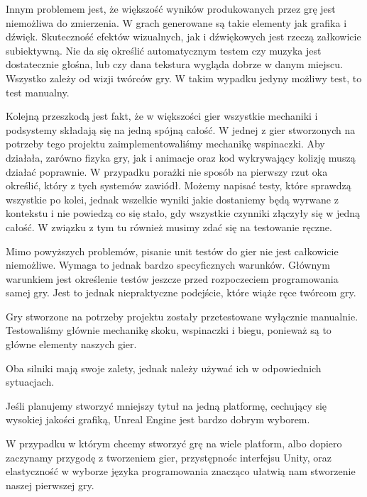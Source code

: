 \documentclass[openright]{xmgr}
\begin{document}
Innym problemem jest, że większość wyników produkowanych przez grę jest niemożliwa do zmierzenia.
W grach generowane są takie elementy jak grafika i dźwięk.  Skuteczność efektów wizualnych, jak i dźwiękowych jest rzeczą załkowicie subiektywną. Nie da się określić automatycznym testem czy muzyka jest dostatecznie głośna, lub czy dana tekstura wygląda dobrze w danym miejscu. Wszystko zależy od wizji twórców gry. W takim wypadku jedyny możliwy test, to test manualny.

Kolejną przeszkodą jest fakt, że w większości gier wszystkie mechaniki i podsystemy składają się na jedną spójną całość. W jednej z gier stworzonych na potrzeby tego projektu zaimplementowaliśmy mechanikę wspinaczki. Aby działała, zarówno fizyka gry, jak i animacje oraz kod wykrywający kolizję muszą działać poprawnie. W przypadku porażki nie sposób na pierwszy rzut oka określić, który z tych systemów zawiódł. Możemy napisać testy, które sprawdzą wszystkie po kolei, jednak wszelkie wyniki jakie dostaniemy będą wyrwane z kontekstu i nie powiedzą co się stało, gdy wszystkie czynniki złączyły się w jedną całość. W związku z tym tu również musimy zdać się na testowanie ręczne.

Mimo powyższych problemów, pisanie unit testów do gier nie jest całkowicie niemożliwe. Wymaga to jednak bardzo specyficznych warunków. Głównym warunkiem jest określenie testów jeszcze przed rozpoczeciem programowania samej gry. Jest to jednak niepraktyczne podejście, które wiąże ręce twórcom gry.

Gry stworzone na potrzeby projektu zostały przetestowane wyłącznie manualnie. Testowaliśmy głównie mechanikę skoku, wspinaczki i biegu, ponieważ są to główne elementy naszych gier.


\summary
Oba silniki mają swoje zalety, jednak należy używać ich w odpowiednich sytuacjach.

Jeśli planujemy stworzyć mniejszy tytuł na jedną platformę, cechujący się wysokiej jakości grafiką, Unreal Engine jest bardzo dobrym wyborem.

W przypadku w którym chcemy stworzyć grę na wiele platform, albo dopiero zaczynamy przygodę z tworzeniem gier, przystępnośc interfejsu Unity, oraz elastyczność w wyborze języka programowania znacząco ułatwią nam stworzenie naszej pierwszej gry.






\nocite{*}



\listoftables

\listoffigures

\oswiadczenie
\end{document}
